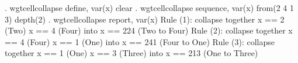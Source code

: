 . wgtcellcollapse define, var(x) clear
{\smallskip}
. wgtcellcollapse sequence, var(x) from(2 4 1 3) depth(2)
{\smallskip}
. wgtcellcollapse report, var(x)
{\smallskip}
Rule (1): collapse together
  x == 2 (Two)
  x == 4 (Four)
  into x == 224 (Two to Four)
{\smallskip}
Rule (2): collapse together
  x == 4 (Four)
  x == 1 (One)
  into x == 241 (Four to One)
{\smallskip}
Rule (3): collapse together
  x == 1 (One)
  x == 3 (Three)
  into x == 213 (One to Three)
{\smallskip}

